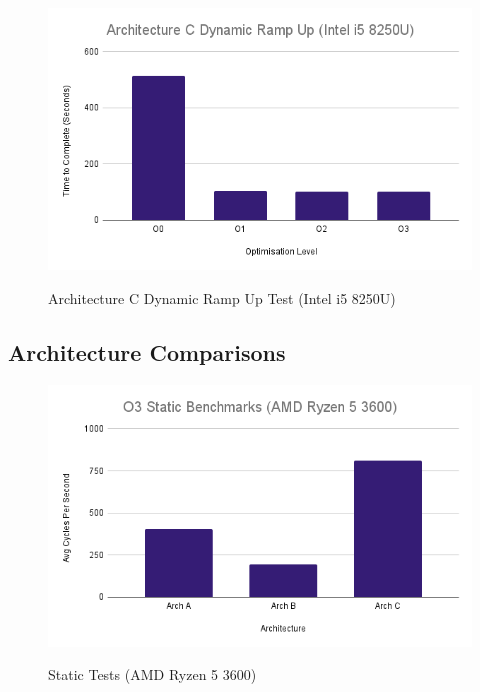 \documentclass{article}
\begin{document}
\begin{figure}[!h]
\centering
\includegraphics[scale=0.5]{Architecture C Dynamic Ramp Up (Intel i5 8250U).png}
\label{arch_c_dynamic_ramp_up_laptop}
\caption{Architecture C Dynamic Ramp Up Test (Intel i5 8250U)}
\end{figure}

\clearpage

\subsection{Architecture Comparisons}
\begin{figure}[!h]
\centering
\includegraphics[scale=0.5]{O3 Static Benchmarks (AMD Ryzen 5 3600).png}
\label{pc_static_tests}
\caption{Static Tests (AMD Ryzen 5 3600)}
\end{figure}
\end{document}
